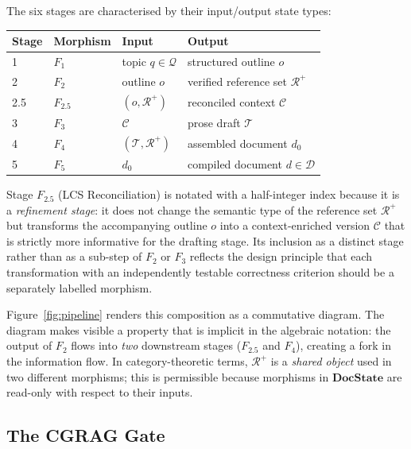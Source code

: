 The six stages are characterised by their input/output state types:

\begin{center}
\begin{tabular}{llll}
\toprule
Stage & Morphism & Input & Output \\
\midrule
1 & $F_1$ & topic $q\in\mathcal{Q}$ & structured outline $o$ \\
2 & $F_2$ & outline $o$ & verified reference set $\mathcal{R}^+$ \\
2.5 & $F_{2.5}$ & $(o, \mathcal{R}^+)$ & reconciled context $\mathcal{C}$ \\
3 & $F_3$ & $\mathcal{C}$ & prose draft $\mathcal{T}$ \\
4 & $F_4$ & $(\mathcal{T}, \mathcal{R}^+)$ & assembled document $d_0$ \\
5 & $F_5$ & $d_0$ & compiled document $d\in\mathcal{D}$ \\
\bottomrule
\end{tabular}
\end{center}

Stage $F_{2.5}$ (LCS Reconciliation) is notated with a half-integer index because it
is a \emph{refinement stage}: it does not change the semantic type of the reference set
$\mathcal{R}^+$ but transforms the accompanying outline $o$ into a context-enriched
version $\mathcal{C}$ that is strictly more informative for the drafting stage.
Its inclusion as a distinct stage rather than as a sub-step of $F_2$ or $F_3$
reflects the design principle that each transformation with an independently testable
correctness criterion should be a separately labelled morphism.

Figure~\ref{fig:pipeline} renders this composition as a commutative diagram.
The diagram makes visible a property that is implicit in the algebraic notation:
the output of $F_2$ flows into \emph{two} downstream stages ($F_{2.5}$ and $F_4$),
creating a fork in the information flow.
In category-theoretic terms, $\mathcal{R}^+$ is a \emph{shared object} used in two
different morphisms; this is permissible because morphisms in $\mathbf{DocState}$
are read-only with respect to their inputs.



\subsection{The CGRAG Gate}

